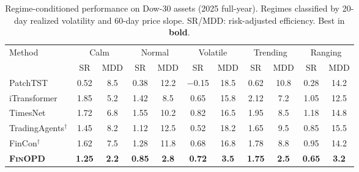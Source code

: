 \begin{table}[t]
\renewcommand{\arraystretch}{0.95}
\footnotesize
\caption{Regime-conditioned performance on Dow-30 assets (2025 full-year). Regimes classified by 20-day realized volatility and 60-day price slope. SR/MDD: risk-adjusted efficiency. Best in \textbf{bold}.}
\setlength{\abovecaptionskip}{0.1cm}
\centering
\setlength{\tabcolsep}{3pt}
\begin{tabular}{lcccccccccc}
\toprule
\multirow{2}{*}{Method} & \multicolumn{2}{c}{Calm} & \multicolumn{2}{c}{Normal} & \multicolumn{2}{c}{Volatile} & \multicolumn{2}{c}{Trending} & \multicolumn{2}{c}{Ranging} \\
\cmidrule(lr){2-3}\cmidrule(lr){4-5}\cmidrule(lr){6-7}\cmidrule(lr){8-9}\cmidrule(lr){10-11}
& SR & MDD & SR & MDD & SR & MDD & SR & MDD & SR & MDD \\
\midrule
PatchTST & 0.52 & 8.5 & 0.38 & 12.2 & $-$0.15 & 18.5 & 0.62 & 10.8 & 0.28 & 14.2 \\
iTransformer & 1.85 & 5.2 & 1.42 & 8.5 & 0.65 & 15.8 & 2.12 & 7.2 & 1.05 & 12.5 \\
TimesNet & 1.72 & 6.8 & 1.55 & 10.2 & 0.82 & 16.5 & 1.95 & 8.5 & 1.18 & 14.8 \\
TradingAgents$^\dagger$ & 1.45 & 8.2 & 1.12 & 12.5 & 0.52 & 18.2 & 1.65 & 9.5 & 0.85 & 15.5 \\
FinCon$^\dagger$ & 1.62 & 7.5 & 1.28 & 11.8 & 0.68 & 16.8 & 1.78 & 8.8 & 0.95 & 14.2 \\
\midrule
\textbf{\textsc{FinOPD}} & \textbf{1.25} & \textbf{2.2} & \textbf{0.85} & \textbf{2.8} & \textbf{0.72} & \textbf{3.5} & \textbf{1.75} & \textbf{2.5} & \textbf{0.65} & \textbf{3.2} \\
\bottomrule
\end{tabular}
\label{tab:regime}
\end{table}
